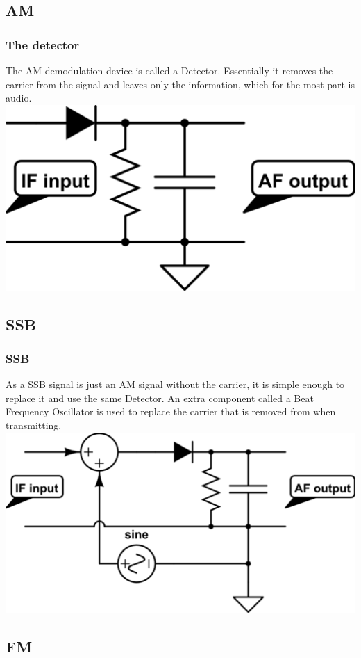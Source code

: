 \documentclass[10pt, handout]{beamer}
\begin{document}
\subsection{AM}

\begin{frame}
\frametitle{The detector}
The AM demodulation device is called a Detector. Essentially it removes the carrier from the signal and leaves only the information, which for the most part is audio.
\includegraphics[width=.9\textwidth]{simpledetector.png}
\end{frame}

\subsection{SSB}

\begin{frame}
\frametitle{SSB}
As a SSB signal is just an AM signal without the carrier, it is simple enough to replace it and use the same Detector. An extra component called a Beat Frequency Oscillator is used to replace the carrier that is removed from when transmitting.
\includegraphics[width=.9\textwidth]{simpleproductdetector.png}
\end{frame}

\subsection{FM}
\end{document}
